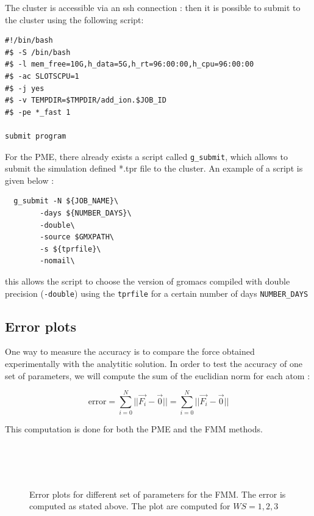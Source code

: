 \documentclass[11pt,twoside,a4paper]{report}
\begin{document}
The cluster is accessible via an ssh connection : then it is possible to submit to the cluster using the following script:


\begin{verbatim}
#!/bin/bash
#$ -S /bin/bash
#$ -l mem_free=10G,h_data=5G,h_rt=96:00:00,h_cpu=96:00:00
#$ -ac SLOTSCPU=1
#$ -j yes
#$ -v TEMPDIR=$TMPDIR/add_ion.$JOB_ID
#$ -pe *_fast 1

submit program 

\end{verbatim}

For the PME, there already exists a script called \texttt{g\_submit}, which allows to submit the simulation defined *.tpr file to the cluster. An example of a script is given below :

\begin{verbatim}
  g_submit -N ${JOB_NAME}\
	    -days ${NUMBER_DAYS}\
	    -double\
	    -source $GMXPATH\
	    -s ${tprfile}\
	    -nomail\
\end{verbatim}

this allows the script to choose the version of gromacs compiled with double precision (\texttt{-double}) using the \texttt{tprfile} for a certain number of days \texttt{NUMBER\_DAYS}



\subsection{Error plots}

One way to measure the accuracy is to compare the force obtained experimentally with the analytitic solution. In order to test the accuracy of one set of parameters, we will compute the sum of the euclidian norm for each atom :

\begin{equation}
	\text{error} = \sum\limits_{i=0}^N ||\vec{F_i} - \vec{0}|| = \sum\limits_{i=0}^N ||\vec{F_i} - \vec{0}||
\end{equation}

 
	This computation is done for both the PME and the FMM methods.\\
	
	    \begin{figure}[H]
  \label{fig:FMM_contour}
    \centering  
 \\    
  \\   
\\    
  
  
    \caption{Error plots for different set of parameters for the FMM. The error is computed as stated above. The plot are computed for $WS = 1,2,3$}    
   \end{figure}  
\end{document}
